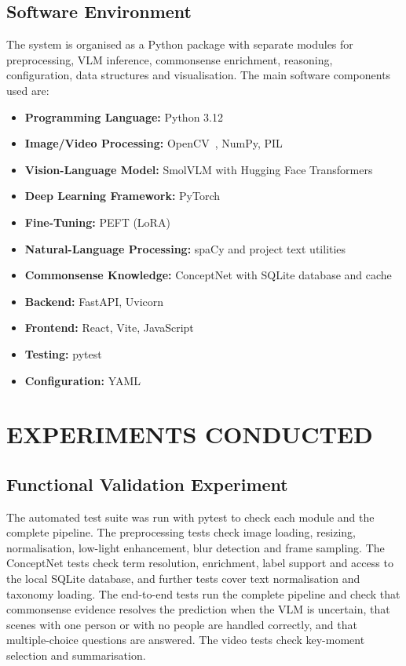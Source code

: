 \subsection{Software Environment}
The system is organised as a Python package with separate modules for preprocessing, VLM inference, commonsense enrichment, reasoning, configuration, data structures and visualisation. The main software components used are:
\begin{itemize}
    \item \textbf{Programming Language:} Python 3.12
    \item \textbf{Image/Video Processing:} OpenCV~\cite{bradski2000opencv}, NumPy, PIL
    \item \textbf{Vision-Language Model:} SmolVLM with Hugging Face Transformers~\cite{wolf2020transformers}
    \item \textbf{Deep Learning Framework:} PyTorch~\cite{paszke2019pytorch}
    \item \textbf{Fine-Tuning:} PEFT (LoRA)
    \item \textbf{Natural-Language Processing:} spaCy and project text utilities
    \item \textbf{Commonsense Knowledge:} ConceptNet with SQLite database and cache
    \item \textbf{Backend:} FastAPI, Uvicorn
    \item \textbf{Frontend:} React, Vite, JavaScript
    \item \textbf{Testing:} pytest
    \item \textbf{Configuration:} YAML
\end{itemize}

\section{EXPERIMENTS CONDUCTED}

\subsection{Functional Validation Experiment}
The automated test suite was run with pytest to check each module and the complete pipeline. The preprocessing tests check image loading, resizing, normalisation, low-light enhancement, blur detection and frame sampling. The ConceptNet tests check term resolution, enrichment, label support and access to the local SQLite database, and further tests cover text normalisation and taxonomy loading. The end-to-end tests run the complete pipeline and check that commonsense evidence resolves the prediction when the VLM is uncertain, that scenes with one person or with no people are handled correctly, and that multiple-choice questions are answered. The video tests check key-moment selection and summarisation.

